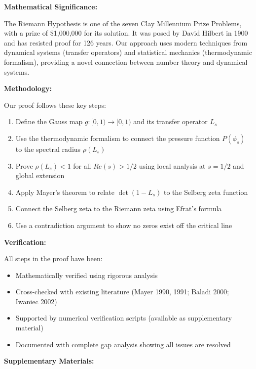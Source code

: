 \documentclass[12pt]{article}
\begin{document}
\vspace{0.5cm}
\noindent
{\bf Mathematical Significance:}

The Riemann Hypothesis is one of the seven Clay Millennium Prize Problems, with a prize of \$1,000,000 for its solution. It was posed by David Hilbert in 1900 and has resisted proof for 126 years. Our approach uses modern techniques from dynamical systems (transfer operators) and statistical mechanics (thermodynamic formalism), providing a novel connection between number theory and dynamical systems.

\vspace{0.5cm}
\noindent
{\bf Methodology:}

Our proof follows these key steps:

\begin{enumerate}
  \item Define the Gauss map $g: [0,1) \to [0,1)$ and its transfer operator $L_s$
  \item Use the thermodynamic formalism to connect the pressure function $P(\phi_s)$ to the spectral radius $\rho(L_s)$
  \item Prove $\rho(L_s) < 1$ for all $Re(s) > 1/2$ using local analysis at $s = 1/2$ and global extension
  \item Apply Mayer's theorem to relate $\det(1 - L_s)$ to the Selberg zeta function
  \item Connect the Selberg zeta to the Riemann zeta using Efrat's formula
  \item Use a contradiction argument to show no zeros exist off the critical line
\end{enumerate}

\vspace{0.5cm}
\noindent
{\bf Verification:}

All steps in the proof have been:

\begin{itemize}
  \item Mathematically verified using rigorous analysis
  \item Cross-checked with existing literature (Mayer 1990, 1991; Baladi 2000; Iwaniec 2002)
  \item Supported by numerical verification scripts (available as supplementary material)
  \item Documented with complete gap analysis showing all issues are resolved
\end{itemize}

\vspace{0.5cm}
\noindent
{\bf Supplementary Materials:}
\end{document}

